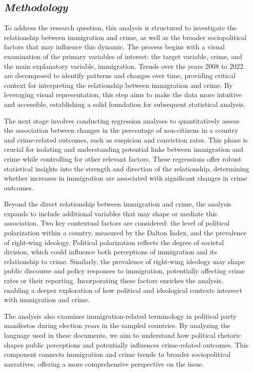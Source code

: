 \documentclass[
]{article}
\begin{document}
\subsection{\texorpdfstring{\emph{Methodology}}{Methodology}}\label{methodology}

To address the research question, this analysis is structured to
investigate the relationship between immigration and crime, as well as
the broader sociopolitical factors that may influence this dynamic. The
process begins with a visual examination of the primary variables of
interest: the target variable, crime, and the main explanatory variable,
immigration. Trends over the years 2008 to 2022 are decomposed to
identify patterns and changes over time, providing critical context for
interpreting the relationship between immigration and crime. By
leveraging visual representation, this step aims to make the data more
intuitive and accessible, establishing a solid foundation for subsequent
statistical analysis.

The next stage involves conducting regression analyses to quantitatively
assess the association between changes in the percentage of non-citizens
in a country and crime-related outcomes, such as suspicion and
conviction rates. This phase is crucial for isolating and understanding
potential links between immigration and crime while controlling for
other relevant factors. These regressions offer robust statistical
insights into the strength and direction of the relationship,
determining whether increases in immigration are associated with
significant changes in crime outcomes.

Beyond the direct relationship between immigration and crime, the
analysis expands to include additional variables that may shape or
mediate this association. Two key contextual factors are considered: the
level of political polarization within a country, measured by the Dalton
Index, and the prevalence of right-wing ideology. Political polarization
reflects the degree of societal division, which could influence both
perceptions of immigration and its relationship to crime. Similarly, the
prevalence of right-wing ideology may shape public discourse and policy
responses to immigration, potentially affecting crime rates or their
reporting. Incorporating these factors enriches the analysis, enabling a
deeper exploration of how political and ideological contexts intersect
with immigration and crime.

The analysis also examines immigration-related terminology in political
party manifestos during election years in the sampled countries. By
analyzing the language used in these documents, we aim to understand how
political rhetoric shapes public perceptions and potentially influences
crime-related outcomes. This component connects immigration and crime
trends to broader sociopolitical narratives, offering a more
comprehensive perspective on the issue.
\end{document}

